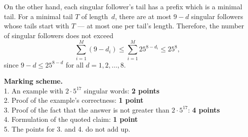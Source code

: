 \documentclass[12pt]{article}
\def \marking{\par \bigskip \textbf{Marking scheme. }}
\begin{document}
On the other hand, each singular follower's tail has a prefix which is a minimal tail. For a minimal tail $T$ of length~$d$, there are at most $9-d$ singular followers whose tails start with $T$ --- at most one per tail's length. Therefore, the number of singular followers does not exceed 
$$
  \sum_{i=1}^M (9-d_i)\leq \sum_{i=1}^M 25^{8-d_i}\leq 25^8,
$$
since $9-d\leq 25^{8-d}$ for all $d=1,2,\dots,8$.


\marking
\\ 1. An example with $2\cdot 5^{17}$ singular words: \dotfill \textbf{2 points}
\\ 2. Proof of the example's correctness: \dotfill \textbf{1 point}
\\ 3. Proof of the fact that the answer is not greater than $2\cdot 5^{17}$: \dotfill \textbf{4 points}
\\ 4. Formulation of the quoted claim: \dotfill \textbf{1 point}
\\ 5. The points for 3. and 4. do not add up.
\end{document}
